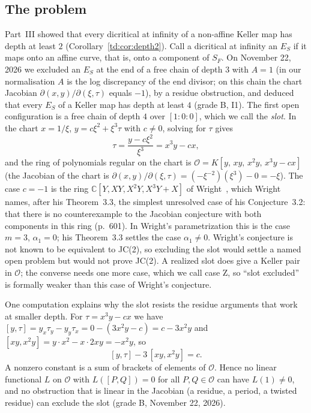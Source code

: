 \documentclass[a4paper,11pt]{article}
\theoremstyle{jsplain}
\theoremstyle{jsdef}
\theoremstyle{jsrem}
\begin{document}
\subsection{The problem}

Part~III showed that every dicritical at infinity of a non-affine Keller map has depth at least $2$ (Corollary~\ref{td:cor:depth2}). Call a dicritical at infinity an $E_S$ if it maps onto an affine curve, that is, onto a component of $S_F$. On November 22, 2026 we excluded an $E_S$ at the end of a free chain of depth $3$ with $A=1$ (in our normalisation $A$ is the log discrepancy of the end divisor; on this chain the chart Jacobian $\partial(x,y)/\partial(\xi,\tau)$ equals $-1$), by a residue obstruction, and deduced that every $E_S$ of a Keller map has depth at least $4$ (grade B, I1). The first open configuration is a free chain of depth $4$ over $[1{:}0{:}0]$, which we call the \emph{slot}. In the chart $x=1/\xi$, $y=c\xi^2+\xi^3\tau$ with $c\ne0$, solving for $\tau$ gives
\[
\tau=\frac{y-c\xi^2}{\xi^3}=x^3y-cx ,
\]
and the ring of polynomials regular on the chart is $\mathcal O=K[y,\,xy,\,x^2y,\,x^3y-cx]$ (the Jacobian of the chart is $\partial(x,y)/\partial(\xi,\tau)=(-\xi^{-2})(\xi^3)-0=-\xi$). The case $c=-1$ is the ring $\mathbb C[Y,XY,X^2Y,X^3Y+X]$ of Wright~\cite{Wright1997}, which Wright names, after his Theorem~3.3, the simplest unresolved case of his Conjecture~3.2: that there is no counterexample to the Jacobian conjecture with both components in this ring (p.~601). In Wright's parametrization this is the case $m=3$, $\alpha_1=0$; his Theorem~3.3 settles the case $\alpha_1\ne0$. Wright's conjecture is not known to be equivalent to JC(2), so excluding the slot would settle a named open problem but would not prove JC(2). A realized slot does give a Keller pair in $\mathcal O$; the converse needs one more case, which we call case Z, so ``slot excluded'' is formally weaker than this case of Wright's conjecture.

One computation explains why the slot resists the residue arguments that work at smaller depth. For $\tau=x^3y-cx$ we have $[y,\tau]=y_x\tau_y-y_y\tau_x=0-(3x^2y-c)=c-3x^2y$ and $[xy,x^2y]=y\cdot x^2-x\cdot2xy=-x^2y$, so
\[
[y,\tau]-3\,[xy,x^2y]=c .
\]
A nonzero constant is a sum of brackets of elements of $\mathcal O$. Hence no linear functional $L$ on $\mathcal O$ with $L([P,Q])=0$ for all $P,Q\in\mathcal O$ can have $L(1)\ne0$, and no obstruction that is linear in the Jacobian (a residue, a period, a twisted residue) can exclude the slot (grade B, November 22, 2026).
\end{document}
